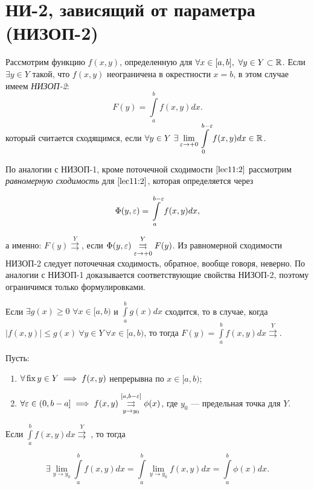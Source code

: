 \documentclass[../../main.tex]{subfiles}
\begin{document}
\section{НИ-2, зависящий от параметра (НИЗОП-2)}

	Рассмотрим функцию $f(x, y)$, определенную для $\forall x \in [a, b],\ 
	\forall 
	y \in Y \subset \R$. Если ${\exists y \in Y}$ такой, что $f(x, y)$ 
	неограничена в 
	окрестности $x = b$, в этом случае имеем \emph{НИЗОП-2}:
	\begin{equation}\label{lec11:3}
		F(y) = \int\limits_a^b f(x, y) dx.
	\end{equation}
	который считается сходящимся, если $\forall y \in Y\ \displaystyle \exists 
	\lim_{\varepsilon \rightarrow 
	+0} \int\limits_0^{b - \varepsilon} f(x, y) dx \in \mathbb{R}$.
	
	По аналогии с НИЗОП-1, кроме поточечной сходимости $\eqref{lec11:2}$ 
	рассмотрим \emph{равномерную сходимость} для $\eqref{lec11:2}$, которая 
	определяется 
	через 
	
	\begin{equation}\label{lec11:4}
		\Phi(y, \varepsilon) = \int\limits_a^{b - \varepsilon} f(x, y) dx,
	\end{equation}
	
	а именно: $F(y) \overset{Y}\rightrightarrows$, если $\Phi(y, \varepsilon) 
	\overset{Y}{\underset{\varepsilon \rightarrow +0}\rightrightarrows} F(y)$. Из 
	равномерной сходимости НИЗОП-2 следует поточечная сходимость, обратное, 
	вообще говоря, неверно. По аналогии с НИЗОП-1 доказывается соответствующие 
	свойства НИЗОП-2, поэтому ограничимся только формулировками.
	
	\begin{thm}
		Если $\exists {g(x) \geq 0}$ $\forall x \in [a, b)$ и $\int\limits_a^b g(x) 
		dx$ 
		сходится, то в случае, когда $|f(x, y)| \leq g(x)\ \forall y \in Y\ \forall 
		x \in [a, b)$, то тогда $F(y) = \int\limits_a^b f(x, y) dx 
		\overset{Y}{\rightrightarrows}$.
	\end{thm}
	
	\begin{thm}
		Пусть:
		
		\begin{enumerate}
			\item $\forall \operatorname{fix} y \in Y \implies f(x, y)$ непрерывна по $x \in [a, 
			b)$;
			\item $\forall \varepsilon \in (0, b - a] \implies f(x, y) \overset{[a, b - 
			\varepsilon]}{\underset{y \rightarrow y_0}\rightrightarrows} \phi(x)$, где $y_0$ 
			--- предельная точка для $Y$.
		\end{enumerate}
		
		Если $\int\limits_a^b f(x, y) dx \overset{Y}\rightrightarrows \;$, то тогда 
		
		\begin{equation}\label{lec11:5}
			\exists \lim_{y \rightarrow y_0} \int\limits_a^b f(x, y) dx = 
			\int\limits_a^b \lim_{y \rightarrow y_0} f(x, y) dx = \int\limits_a^b 
			\phi(x) dx.
		\end{equation}
	\end{thm}
\end{document}
